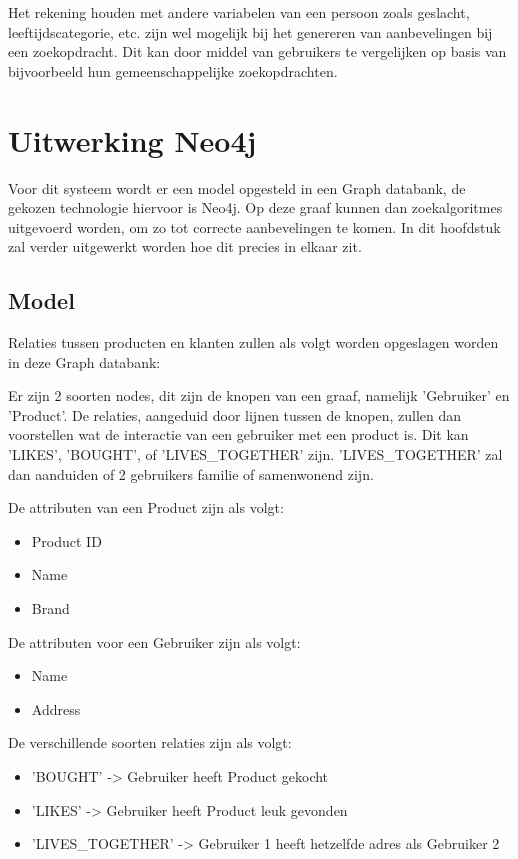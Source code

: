Het rekening houden met andere variabelen van een persoon zoals geslacht, leeftijdscategorie, etc. zijn wel mogelijk bij het genereren van aanbevelingen bij een zoekopdracht. Dit kan door middel van gebruikers te vergelijken op basis van bijvoorbeeld hun gemeenschappelijke zoekopdrachten.

\section{Uitwerking Neo4j}
\label{sec:UItwerking Neo4j}

Voor dit systeem wordt er een model opgesteld in een Graph databank, de gekozen technologie hiervoor is Neo4j. Op deze graaf kunnen dan zoekalgoritmes uitgevoerd worden, om zo tot correcte aanbevelingen te komen. In dit hoofdstuk zal verder uitgewerkt worden hoe dit precies in elkaar zit.

\subsection{Model}
\label{sec:Model}
Relaties tussen producten en klanten zullen als volgt worden opgeslagen worden in deze Graph databank:

Er zijn 2 soorten nodes, dit zijn de knopen van een graaf, namelijk 'Gebruiker' en 'Product'. De relaties, aangeduid door lijnen tussen de knopen, zullen dan voorstellen wat de interactie van een gebruiker met een product is. Dit kan 'LIKES', 'BOUGHT', of 'LIVES\_TOGETHER' zijn. 'LIVES\_TOGETHER' zal dan aanduiden of 2 gebruikers familie of samenwonend zijn. 

De attributen van een Product zijn als volgt:
\begin{itemize}
	\item Product ID
	\item Name
	\item Brand
\end{itemize}

De attributen voor een Gebruiker zijn als volgt:
\begin{itemize}
	\item Name
	\item Address
\end{itemize}

De verschillende soorten relaties zijn als volgt:
\begin{itemize}
	\item 'BOUGHT' -> Gebruiker heeft Product gekocht
	\item 'LIKES' -> Gebruiker heeft Product leuk gevonden
	\item 'LIVES\_TOGETHER' -> Gebruiker 1 heeft hetzelfde adres als Gebruiker 2
\end{itemize}

